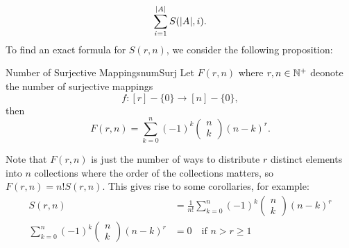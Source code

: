 \documentclass[math]{amznotes}
\theoremstyle{remark}
\begin{document}
\begin{equation*}
    \sum_{i = 1}^{{\left\lvert {A} \right\rvert}}S({\left\lvert {A} \right\rvert}, i).
\end{equation*}
To find an exact formula for $S(r, n)$, we consider the following proposition:
\begin{probox}{Number of Surjective Mappings}{numSurj}
    Let $F(r, n)$ where $r, n \in \mathbb{N}^+$ deonote the number of surjective mappings
    \begin{equation*}
        f \colon [r] - \{0\} \to [n] - \{0\},
    \end{equation*}
    then
    \begin{equation*}
        F(r, n) = \sum_{k = 0}^{n}(-1)^k \begin{pmatrix}
            n \\
            k
        \end{pmatrix}(n - k)^r.
    \end{equation*}
\end{probox}
Note that $F(r, n)$ is just the number of ways to distribute $r$ distinct elements into $n$ collections where the order of the collections matters, so $F(r, n) = n!S(r, n)$. This gives rise to some corollaries, for example:
\begin{align*}
    S(r, n) & =\frac{1}{n!} \sum_{k = 0}^{n}(-1)^k \begin{pmatrix}
        n \\
        k
    \end{pmatrix}(n - k)^r \\
    \sum_{k = 0}^{n}(-1)^k \begin{pmatrix}
        n \\
        k
    \end{pmatrix}(n - k)^r & = 0 \quad \textrm{if }n > r \geq 1
\end{align*}
\end{document}
